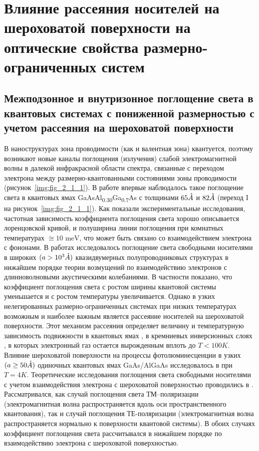 \chapter{Влияние рассеяния носителей на шероховатой поверхности на оптические свойства размерно-ограниченных систем} \label{chapt2}

\section{Межподзонное и внутризонное поглощение света в квантовых системах с пониженной размерностью с учетом рассеяния на шероховатой поверхности} \label{sect2_1}

В наноструктурах зона проводимости (как и валентная зона) квантуется, поэтому возникают новые каналы поглощения (излучения) слабой электромагнитной волны в далекой инфракрасной области спектра, связанные с переходом электрона между размерно-квантованными состояниями зоны проводимости (рисунок~\ref{img:fig_2_1_1}).  В работе \cite{West1985} впервые наблюдалось такое поглощение света в квантовых ямах GaAsAl\textsubscript{0.30}Ga\textsubscript{0.7}As с толщинами $65 \AA$ и $82 \AA$ (переход I на рисунок~\ref{img:fig_2_1_1}). Как показали экспериментальные исследования, частотная зависимость коэффициента поглощения света хорошо описывается лоренцовской кривой, и полуширина линии поглощения при комнатных температурах $\cong 10 \text{ meV}$, что может быть связано со взаимодействием электрона с фононами. В работах \cite{Wu1994,Spector1983} исследовалось поглощение света свободными носителями в широких $(a > 10^3 \AA)$ квазидвумерных полупроводниковых структурах в нижайшем порядке теории возмущений по взаимодействию электронов с длинноволновыми акустическими колебаниями. В частности показано, что коэффициент поглощения света с ростом ширины квантовой системы уменьшается и с ростом температуры увеличивается. Однако в узких нелегированных размерно-ограниченных системах при низких температурах возможным и наиболее важным является рассеяние носителей на шероховатой поверхности. Этот механизм рассеяния определяет величину и температурную зависимость подвижности в квантовых ямах \cite{Sakaki1987}, в кремниевых инверсионных слоях \cite{Stern1980}, в которых электронный газ остается вырожденным вплоть до $T < 100 K$. Влияние шероховатой поверхности на процессы фотолюминесценции в узких $(a \geq 50 \AA)$ одиночных квантовых ямах GaAs/AlGaAs  исследовалось в \cite{Gurioli1991} при $T = 4 K$. Теоретические исследования поглощения света свободными носителями с учетом взаимодействия электрона с шероховатой поверхностью проводились в \cite{Vurgaftman1999}. Рассматривался, как случай поглощения света ТМ–поляризации (электромагнитная волна распространяется вдоль оси пространственного квантования), так и случай поглощения ТЕ-поляризации (электромагнитная волна распространяется нормально к поверхности квантовой системы). В обоих случаях коэффициент поглощения света рассчитывался в нижайшем порядке по взаимодействию электрона с шероховатой поверхностью.

